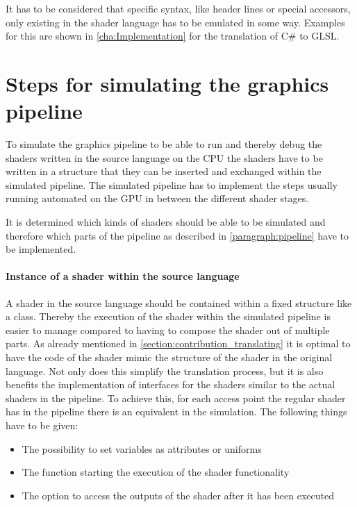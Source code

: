 It has to be considered that specific syntax, like header lines or special accessors, only existing in the shader language has to be emulated in some way. Examples for this are shown in \autoref{cha:Implementation} for the translation of C\# to GLSL.

\section{Steps for simulating the graphics pipeline}
\label{section:contribution_simulating}

To simulate the graphics pipeline to be able to run and thereby debug the shaders written in the source language on the CPU the shaders have to be written in a structure that they can be inserted and exchanged within the simulated pipeline. The simulated pipeline has to implement the steps usually running automated on the GPU in between the different shader stages.

It is determined which kinds of shaders should be able to be simulated and therefore which parts of the pipeline as described in \autoref{paragraph:pipeline} have to be implemented.

\paragraph{Instance of a shader within the source language}

A shader in the source language should be contained within a fixed structure like a class. Thereby the execution of the shader within the simulated pipeline is easier to manage compared to having to compose the shader out of multiple parts.
As already mentioned in \autoref{section:contribution_translating} it is optimal to have the code of the shader mimic the structure of the shader in the original language. Not only does this simplify the translation process, but it is also benefits the implementation of interfaces for the shaders similar to the actual shaders in the pipeline. To achieve this, for each access point the regular shader has in the pipeline there is an equivalent in the simulation. The following things have to be given:
\begin{itemize}
\item The possibility to set variables as attributes or uniforms
\item The function starting the execution of the shader functionality
\item The option to access the outputs of the shader after it has been executed
\end{itemize}

